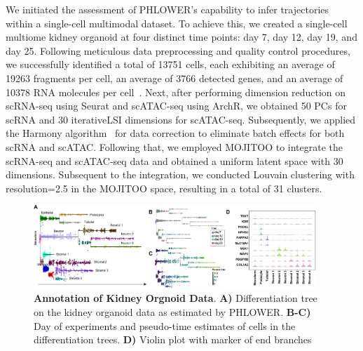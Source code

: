 We initiated the assessment of PHLOWER's capability to infer trajectories within a single-cell multimodal dataset. To achieve this, we created a single-cell multiome kidney organoid at four distinct time points: day \num{7}, day \num{12}, day \num{19}, and day \num{25}\citep{jansen2022sars}. Following meticulous data preprocessing and quality control procedures, we successfully identified a total of \num{13751} cells, each exhibiting an average of \num{19263} fragments per cell, an average of \num{3766} detected genes, and an average of \num{10378} RNA molecules per cell~. Next, after performing dimension reduction on scRNA-seq using Seurat and scATAC-seq using ArchR, we obtained 50 PCs for scRNA and 30 iterativeLSI dimensions for scATAC-seq. Subsequently, we applied the Harmony algorithm~\citep{korsunsky2019harmony} for data correction to eliminate batch effects for both scRNA and scATAC. Following that, we employed MOJITOO to integrate the scRNA-seq and scATAC-seq data and obtained a uniform latent space with 30 dimensions. Subsequent to the integration, we conducted Louvain clustering with resolution=2.5 in the MOJITOO space, resulting in a total of \num{31} clusters.

\begin{figure}[!h]
	\centering
	\includegraphics[width=0.95\textwidth]{kidney_main/fig}
	\vspace{0.1cm}
	\caption[Annotation of Kidney Orgnoid Data]{\textbf{Annotation of Kidney Orgnoid Data}. \textbf{A)} Differentiation tree on the kidney organoid data as estimated by PHLOWER. \textbf{B-C)} Day of experiments and pseudo-time estimates of cells in the differentiation trees. \textbf{D)} Violin plot with marker of end branches}
	\label{fig:kidney_organoid}
\end{figure}

